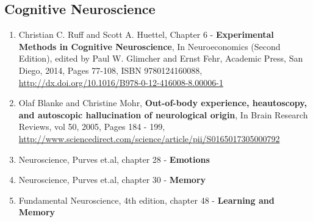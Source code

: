 \documentclass[12pt,article,oneside,a4paper]{memoir}
\begin{document}
\subsection{Cognitive Neuroscience}
\begin{enumerate}
\renewcommand{\labelenumi}{\textbf{\theenumi}}
\item Christian C. Ruff and Scott A. Huettel, Chapter 6 - \textbf{Experimental Methods in Cognitive Neuroscience}, In Neuroeconomics (Second Edition), edited by Paul W. Glimcher and Ernst Fehr, Academic Press, San Diego, 2014, Pages 77-108, ISBN 9780124160088, \url{http://dx.doi.org/10.1016/B978-0-12-416008-8.00006-1}
\item Olaf Blanke and Christine Mohr, \textbf{Out-of-body experience, heautoscopy, and autoscopic hallucination of neurological origin}, In Brain Research Reviews, vol 50, 2005, Pages 184 - 199, \url{http://www.sciencedirect.com/science/article/pii/S0165017305000792}  \label{ref:out-of-body}
\item Neuroscience, Purves et.al, chapter 28 - \textbf{Emotions}
\item Neuroscience, Purves et.al, chapter 30 - \textbf{Memory}
\item Fundamental Neuroscience, 4th edition, chapter 48 - \textbf{Learning and Memory}
\end{enumerate}
\end{document}
